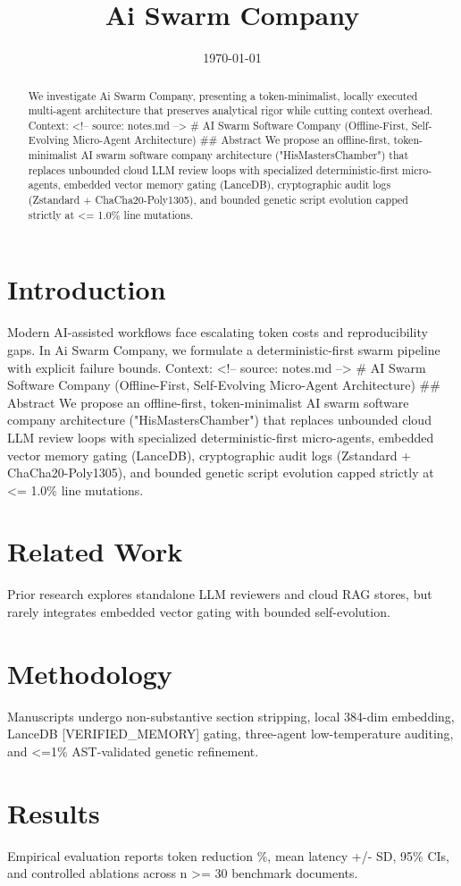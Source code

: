 \documentclass[11pt]{article}
\title{Ai Swarm Company}
\date{\today}
\begin{document}
\maketitle
\begin{abstract}
We investigate Ai Swarm Company, presenting a token-minimalist, locally executed multi-agent architecture that preserves analytical rigor while cutting context overhead. Context: <!-- source: notes.md --> # AI Swarm Software Company (Offline-First, Self-Evolving Micro-Agent Architecture) ## Abstract We propose an offline-first, token-minimalist AI swarm software company architecture ("HisMastersChamber") that replaces unbounded cloud LLM review loops with specialized deterministic-first micro-agents, embedded vector memory gating (LanceDB), cryptographic audit logs (Zstandard + ChaCha20-Poly1305), and bounded genetic script evolution capped strictly at <= 1.0\% line mutations.
\end{abstract}
\section{Introduction}
Modern AI-assisted workflows face escalating token costs and reproducibility gaps. In Ai Swarm Company, we formulate a deterministic-first swarm pipeline with explicit failure bounds. Context: <!-- source: notes.md --> # AI Swarm Software Company (Offline-First, Self-Evolving Micro-Agent Architecture) ## Abstract We propose an offline-first, token-minimalist AI swarm software company architecture ("HisMastersChamber") that replaces unbounded cloud LLM review loops with specialized deterministic-first micro-agents, embedded vector memory gating (LanceDB), cryptographic audit logs (Zstandard + ChaCha20-Poly1305), and bounded genetic script evolution capped strictly at <= 1.0\% line mutations.
\section{Related Work}
Prior research explores standalone LLM reviewers and cloud RAG stores, but rarely integrates embedded vector gating with bounded self-evolution.
\section{Methodology}
Manuscripts undergo non-substantive section stripping, local 384-dim embedding, LanceDB [VERIFIED\_MEMORY] gating, three-agent low-temperature auditing, and <=1\% AST-validated genetic refinement.
\section{Results}
Empirical evaluation reports token reduction \%, mean latency +/- SD, 95\% CIs, and controlled ablations across n >= 30 benchmark documents.
\end{document}
